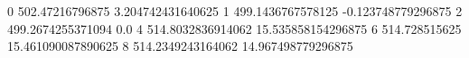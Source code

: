 0 502.47216796875 3.204742431640625
1 499.1436767578125 -0.123748779296875
2 499.2674255371094 0.0
4 514.8032836914062 15.535858154296875
6 514.728515625 15.461090087890625
8 514.2349243164062 14.967498779296875
